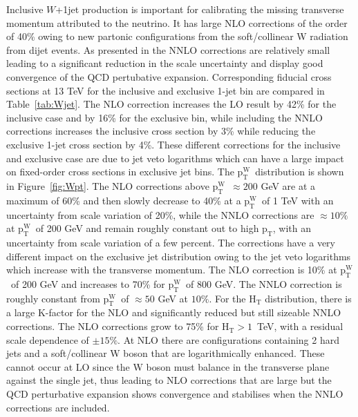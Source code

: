 \documentclass[a4paper,11pt,notoc]{article}
\newcommand{\pt}{\ensuremath{\mathrm{p_T}}}
\newcommand{\ptW}{\ensuremath{\mathrm{p_T^{W}}}}
\newcommand{\Ht}{\ensuremath{\mathrm{H_T}}}
\begin{document}
Inclusive $W$+1jet production is important for calibrating the missing transverse momentum attributed to the neutrino. It has large NLO corrections of the order of 40\% owing to new partonic configurations from the soft/collinear W radiation from dijet events. As presented in \cite{Boughezal:2016dtm} the NNLO corrections are relatively small leading to a significant reduction in the scale uncertainty and display good convergence of the QCD pertubative expansion. %
%
Corresponding fiducial cross sections at 13 TeV for the inclusive and exclusive 1-jet bin are compared in Table~\ref{tab:Wjet}. The NLO correction increases the LO result by 42\% for the inclusive case and by 16\% for the exclusive bin, while including the NNLO corrections increases the inclusive cross section by 3\% while reducing the exclusive 1-jet cross section by 4\%. These different corrections for the inclusive and exclusive case are due to jet veto logarithms which can have a large impact on fixed-order cross sections in exclusive jet bins. The \ptW\ distribution is shown in Figure~\ref{fig:Wpt}. The NLO corrections above \ptW\ $\approx 200$ GeV are at a maximum of 60\% and then slowly decrease to 40\% at a \ptW\ of 1 TeV with an uncertainty from scale variation of 20\%, while the NNLO corrections are $\approx10\%$ at \ptW\ of 200 GeV and remain roughly constant out to high \pt, with an uncertainty from scale variation of a few percent. The corrections have a very different impact on the exclusive jet distribution owing to the jet veto logarithms which increase with the transverse momentum. The NLO correction is 10\% at \ptW\ of 200 GeV and increases to 70\% for \ptW\ of 800 GeV. The NNLO correction is roughly constant from \ptW\ of $\approx 50$ GeV at $10\%$. For the $\Ht$ distribution, there is a large K-factor for the NLO and significantly reduced but still sizeable NNLO corrections. The NLO corrections grow to 75\% for $\Ht > 1$~TeV, with a residual scale dependence of $\pm 15\%$. %
At NLO there are configurations containing 2 hard jets and a soft/collinear W boson that are logarithmically enhanced. These cannot occur at LO since the W boson must balance in the transverse plane against the single jet, thus leading to NLO corrections that are large but the QCD perturbative expansion shows convergence and stabilises when the NNLO corrections are included. 
\end{document}
